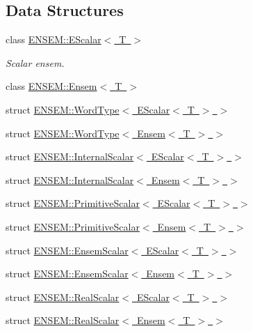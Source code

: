 \subsection*{Data Structures}
\begin{DoxyCompactItemize}
\item 
class \mbox{\hyperlink{classENSEM_1_1EScalar}{E\+N\+S\+E\+M\+::\+E\+Scalar$<$ T $>$}}
\begin{DoxyCompactList}\small\item\em Scalar ensem. \end{DoxyCompactList}\item 
class \mbox{\hyperlink{classENSEM_1_1Ensem}{E\+N\+S\+E\+M\+::\+Ensem$<$ T $>$}}
\item 
struct \mbox{\hyperlink{structENSEM_1_1WordType_3_01EScalar_3_01T_01_4_01_4}{E\+N\+S\+E\+M\+::\+Word\+Type$<$ E\+Scalar$<$ T $>$ $>$}}
\item 
struct \mbox{\hyperlink{structENSEM_1_1WordType_3_01Ensem_3_01T_01_4_01_4}{E\+N\+S\+E\+M\+::\+Word\+Type$<$ Ensem$<$ T $>$ $>$}}
\item 
struct \mbox{\hyperlink{structENSEM_1_1InternalScalar_3_01EScalar_3_01T_01_4_01_4}{E\+N\+S\+E\+M\+::\+Internal\+Scalar$<$ E\+Scalar$<$ T $>$ $>$}}
\item 
struct \mbox{\hyperlink{structENSEM_1_1InternalScalar_3_01Ensem_3_01T_01_4_01_4}{E\+N\+S\+E\+M\+::\+Internal\+Scalar$<$ Ensem$<$ T $>$ $>$}}
\item 
struct \mbox{\hyperlink{structENSEM_1_1PrimitiveScalar_3_01EScalar_3_01T_01_4_01_4}{E\+N\+S\+E\+M\+::\+Primitive\+Scalar$<$ E\+Scalar$<$ T $>$ $>$}}
\item 
struct \mbox{\hyperlink{structENSEM_1_1PrimitiveScalar_3_01Ensem_3_01T_01_4_01_4}{E\+N\+S\+E\+M\+::\+Primitive\+Scalar$<$ Ensem$<$ T $>$ $>$}}
\item 
struct \mbox{\hyperlink{structENSEM_1_1EnsemScalar_3_01EScalar_3_01T_01_4_01_4}{E\+N\+S\+E\+M\+::\+Ensem\+Scalar$<$ E\+Scalar$<$ T $>$ $>$}}
\item 
struct \mbox{\hyperlink{structENSEM_1_1EnsemScalar_3_01Ensem_3_01T_01_4_01_4}{E\+N\+S\+E\+M\+::\+Ensem\+Scalar$<$ Ensem$<$ T $>$ $>$}}
\item 
struct \mbox{\hyperlink{structENSEM_1_1RealScalar_3_01EScalar_3_01T_01_4_01_4}{E\+N\+S\+E\+M\+::\+Real\+Scalar$<$ E\+Scalar$<$ T $>$ $>$}}
\item 
struct \mbox{\hyperlink{structENSEM_1_1RealScalar_3_01Ensem_3_01T_01_4_01_4}{E\+N\+S\+E\+M\+::\+Real\+Scalar$<$ Ensem$<$ T $>$ $>$}}
\item 

\end{DoxyCompactItemize}
